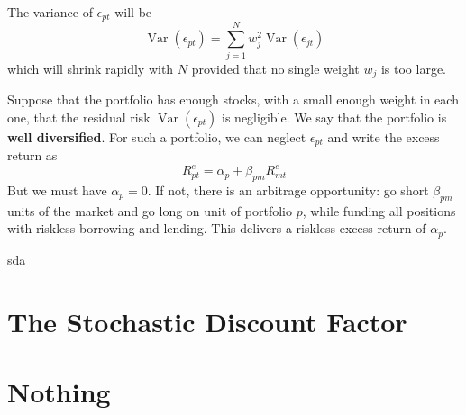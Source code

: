 \documentclass[11pt,green,twocol,citestyle=authoryear, bibstyle=authoryear]{elegantbook}
\begin{document}
The variance of $ \epsilon_{p t} $ will be 
\begin{equation*}
    \operatorname{Var}\left(\epsilon_{p t}\right)=\sum_{j=1}^N w_j^2 \operatorname{Var}\left(\epsilon_{j t}\right)
\end{equation*}
which will shrink rapidly with $ N $  provided that no single weight $ w_j $  is too large.

Suppose that the portfolio has enough stocks, with a small enough weight in each one, that the residual risk $ \operatorname{Var}\left(\epsilon_{p t}\right) $ is negligible. We say that the portfolio is \textbf{well diversified}. For such a portfolio, we can neglect $ \epsilon_{p t} $ and write the excess return as
\begin{equation*}
    R_{p t}^e=\alpha_p+\beta_{p m} R_{m t}^e
\end{equation*}
But we must have $ \alpha_p  = 0 $. If not, there is an arbitrage opportunity: go short $ \beta_{pm} $ units of the market and go long on unit of portfolio $ p $, while funding all positions with riskless borrowing and lending. This delivers a riskless excess return of $ \alpha_p $.  

\cite{Ross_1976} sda

\chapter{The Stochastic Discount Factor}


\printbibliography[heading=bibintoc, title=\ebibname]


\appendix


\chapter{Nothing}
\end{document}
